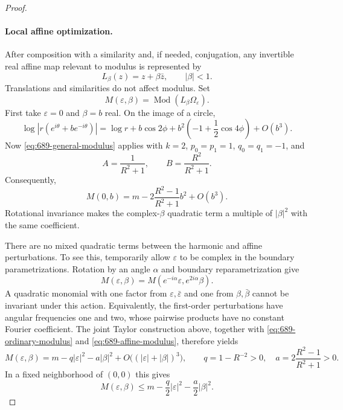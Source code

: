 \documentclass[11pt,a4paper]{article}
\theoremstyle{remark}
\begin{document}
\begin{proof}
\paragraph{Local affine optimization.}
After composition with a similarity and, if needed, conjugation, any invertible real affine map relevant to modulus is represented by
\[
 L_\beta(z)=z+\beta\bar z,\qquad |\beta|<1.
\]
Translations and similarities do not affect modulus. Set
\[
 M(\varepsilon,\beta)=\operatorname{Mod}(L_\beta\Omega_\varepsilon).
\]
First take $\varepsilon=0$ and $\beta=b$ real. On the image of a circle,
\begin{equation}
 \log|r(e^{i\theta}+b e^{-i\theta})|
 =\log r+b\cos2\phi
        +b^2\left(-1+\frac12\cos4\phi\right)+O(b^3).
 \label{eq:689-affine-boundary-expansion}
\end{equation}
Now \eqref{eq:689-general-modulus} applies with $k=2$, $p_0=p_1=1$, $q_0=q_1=-1$, and
\[
 A=\frac1{R^2+1},\qquad B=\frac{R^2}{R^2+1}.
\]
Consequently,
\begin{equation}
 M(0,b)=m-2\frac{R^2-1}{R^2+1}b^2+O(b^3).
 \label{eq:689-affine-modulus}
\end{equation}
Rotational invariance makes the complex-$\beta$ quadratic term a multiple of $|\beta|^2$ with the same coefficient.

There are no mixed quadratic terms between the harmonic and affine perturbations. To see this, temporarily allow $\varepsilon$ to be complex in the boundary parametrizations. Rotation by an angle $\alpha$ and boundary reparametrization give
\begin{equation}
 M(\varepsilon,\beta)=M(e^{-i\alpha}\varepsilon,e^{2i\alpha}\beta).
 \label{eq:689-rotation-identity}
\end{equation}
A quadratic monomial with one factor from $\varepsilon,\bar\varepsilon$ and one from $\beta,\bar\beta$ cannot be invariant under this action. Equivalently, the first-order perturbations have angular frequencies one and two, whose pairwise products have no constant Fourier coefficient. The joint Taylor construction above, together with \eqref{eq:689-ordinary-modulus} and \eqref{eq:689-affine-modulus}, therefore yields
\begin{equation}
 M(\varepsilon,\beta)
 =m-q|\varepsilon|^2-a|\beta|^2
       +O\bigl((|\varepsilon|+|\beta|)^3\bigr),
 \qquad
 q=1-R^{-2}>0,\quad a=2\frac{R^2-1}{R^2+1}>0.
 \label{eq:689-joint-expansion}
\end{equation}
In a fixed neighborhood of $(0,0)$ this gives
\begin{equation}
 M(\varepsilon,\beta)
 \le m-\frac q2|\varepsilon|^2-\frac a2|\beta|^2.
 \label{eq:689-local-upper}
\end{equation}


\end{proof}
\end{document}
